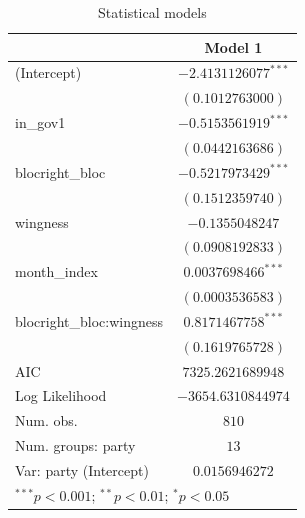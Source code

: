 
\begin{table}
\begin{center}
\begin{tabular}{l c}
\hline
 & Model 1 \\
\hline
(Intercept)              & $-2.4131126077^{***}$ \\
                         & $(0.1012763000)$      \\
in\_gov1                 & $-0.5153561919^{***}$ \\
                         & $(0.0442163686)$      \\
blocright\_bloc          & $-0.5217973429^{***}$ \\
                         & $(0.1512359740)$      \\
wingness                 & $-0.1355048247$       \\
                         & $(0.0908192833)$      \\
month\_index             & $0.0037698466^{***}$  \\
                         & $(0.0003536583)$      \\
blocright\_bloc:wingness & $0.8171467758^{***}$  \\
                         & $(0.1619765728)$      \\
\hline
AIC                      & $7325.2621689948$     \\
Log Likelihood           & $-3654.6310844974$    \\
Num. obs.                & $810$                 \\
Num. groups: party       & $13$                  \\
Var: party (Intercept)   & $0.0156946272$        \\
\hline
\multicolumn{2}{l}{\scriptsize{$^{***}p<0.001$; $^{**}p<0.01$; $^{*}p<0.05$}}
\end{tabular}
\caption{Statistical models}
\label{table:coefficients}
\end{center}
\end{table}

